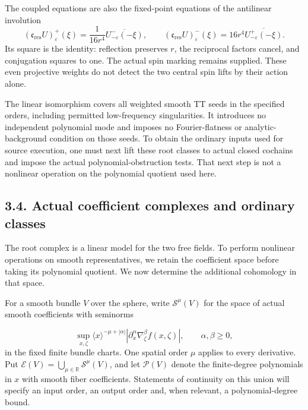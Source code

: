 \documentclass[
  english,
  11pt,
  reqno]{amsart}
\begin{document}
The coupled equations are also the fixed-point equations of the
antilinear involution \[
(\mathfrak c_{\mathrm{res}}U)^+_\varepsilon(\xi)
=\frac1{16r^4}\overline{U^-_{-\varepsilon}(-\xi)},
\qquad
(\mathfrak c_{\mathrm{res}}U)^-_\varepsilon(\xi)
=16r^4\overline{U^+_{-\varepsilon}(-\xi)}.
\] Its square is the identity: reflection preserves \(r\), the
reciprocal factors cancel, and conjugation squares to one. The actual
spin marking remains supplied. These even projective weights do not
detect the two central spin lifts by their action alone.

The linear isomorphism covers all weighted smooth TT seeds in the
specified orders, including permitted low-frequency singularities. It
introduces no independent polynomial mode and imposes no
Fourier-flatness or analytic-background condition on those seeds. To
obtain the ordinary inputs used for source execution, one must next lift
these root classes to actual closed cochains and impose the actual
polynomial-obstruction tests. That next step is not a nonlinear
operation on the polynomial quotient used here.

\subsection{3.4. Actual coefficient complexes and ordinary
classes}\label{actual-coefficient-complexes-and-ordinary-classes}\label{sec:online-actual-coefficient-complexes}

The root complex is a linear model for the two free fields. To perform
nonlinear operations on smooth representatives, we retain the
coefficient space before taking its polynomial quotient. We now
determine the additional cohomology in that space.

For a smooth bundle \(V\) over the sphere, write \(\mathscr S^\mu(V)\)
for the space of actual smooth coefficients with seminorms

\label{eq:online-actual-symbol-seminorms} \[
\sup_{x,\zeta}\langle x\rangle^{-\mu+|\alpha|}
\left|\partial_x^\alpha\nabla_\zeta^\beta f(x,\zeta)\right|,
\qquad \alpha,\beta\ge0,
\] in the fixed finite bundle charts. One spatial order \(\mu\) applies
to every derivative. Put
\(\mathscr E(V)=\bigcup_{\mu\in\mathbb R}\mathscr S^\mu(V)\), and let
\(\mathscr P(V)\) denote the finite-degree polynomials in \(x\) with
smooth fiber coefficients. Statements of continuity on this union will
specify an input order, an output order and, when relevant, a
polynomial-degree bound.
\end{document}

